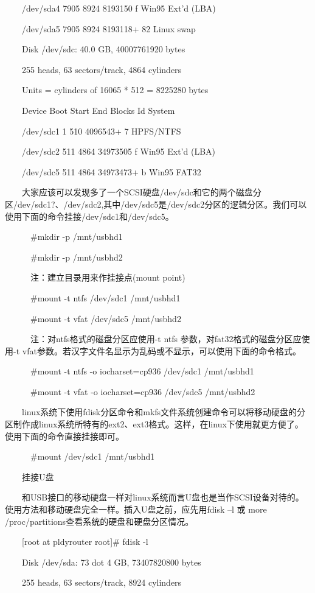 \documentclass[11pt]{article}
\begin{document}
\begin{enumerate}
　　/dev/sda4 7905 8924 8193150 f Win95 Ext'd (LBA)

　　/dev/sda5 7905 8924 8193118+ 82 Linux swap

　　Disk /dev/sdc: 40.0 GB, 40007761920 bytes

　　255 heads, 63 sectors/track, 4864 cylinders

　　Units = cylinders of 16065 * 512 = 8225280 bytes

　　Device Boot Start End Blocks Id System

　　/dev/sdc1 1 510 4096543+ 7 HPFS/NTFS

　　/dev/sdc2 511 4864 34973505 f Win95 Ext'd (LBA)

　　/dev/sdc5 511 4864 34973473+ b Win95 FAT32

　　大家应该可以发现多了一个SCSI硬盘/dev/sdc和它的两个磁盘分区/dev/sdc1?、/dev/sdc2,其中/dev/sdc5是/dev/sdc2分区的逻辑分区。我们可以使用下面的命令挂接/dev/sdc1和/dev/sdc5。

　　　\#mkdir -p /mnt/usbhd1

　　　\#mkdir -p /mnt/usbhd2

　　　注：建立目录用来作挂接点(mount point)

　　　\#mount -t ntfs /dev/sdc1 /mnt/usbhd1

　　　\#mount -t vfat /dev/sdc5 /mnt/usbhd2

　　　注：对ntfs格式的磁盘分区应使用-t ntfs 参数，对fat32格式的磁盘分区应使用-t vfat参数。若汉字文件名显示为乱码或不显示，可以使用下面的命令格式。

　　　\#mount -t ntfs -o iocharset=cp936 /dev/sdc1 /mnt/usbhd1

　　　\#mount -t vfat -o iocharset=cp936 /dev/sdc5 /mnt/usbhd2

　　linux系统下使用fdisk分区命令和mkfs文件系统创建命令可以将移动硬盘的分区制作成linux系统所特有的ext2、ext3格式。这样，在linux下使用就更方便了。使用下面的命令直接挂接即可。

　　　\#mount /dev/sdc1 /mnt/usbhd1　　　

　　挂接U盘

　　和USB接口的移动硬盘一样对linux系统而言U盘也是当作SCSI设备对待的。使用方法和移动硬盘完全一样。插入U盘之前，应先用fdisk –l 或 more /proc/partitions查看系统的硬盘和硬盘分区情况。

　　[root at pldyrouter root]\# fdisk -l

　　Disk /dev/sda: 73 dot 4 GB, 73407820800 bytes

　　255 heads, 63 sectors/track, 8924 cylinders


\end{enumerate}
\end{document}
